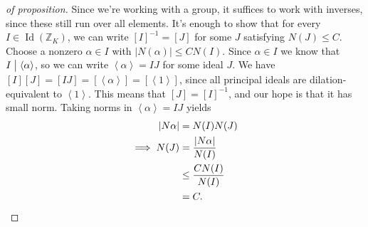 \begin{proof}[of proposition]

Since we're working with a group, it suffices to work with inverses,
since these still run over all elements. It's enough to show that for
every \(I \in \operatorname{Id}({\mathbb{Z}}_K)\), we can write
\([I]^{-1}= [J]\) for some \(J\) satisfying \(N(J) \leq C\). Choose a
nonzero \(\alpha\in I\) with
\({\left\lvert {N( \alpha )} \right\rvert}\leq C N(I)\). Since
\(\alpha\in I\) we know that
\(I \bigm|\left\langle{ \alpha }\right\rangle\), so we can write
\(\left\langle{ \alpha }\right\rangle = IJ\) for some ideal \(J\). We
have
\([I] [J] = [IJ] = [ \left\langle{ \alpha }\right\rangle ] = [ \left\langle{ 1 }\right\rangle ]\),
since all principal ideals are dilation-equivalent to
\(\left\langle{ 1 }\right\rangle\). This means that \([J] = [I] ^{-1}\),
and our hope is that it has small norm. Taking norms in
\(\left\langle{ \alpha }\right\rangle = IJ\) yields
\begin{align*}
{\left\lvert {N \alpha} \right\rvert} 
&= N(I) N(J) \\
\implies N(J) 
&= { {\left\lvert {N \alpha} \right\rvert} \over N(I) } \\
&\leq { C N(I) \over N(I)} \\
&= C
.\end{align*}

\end{proof}

